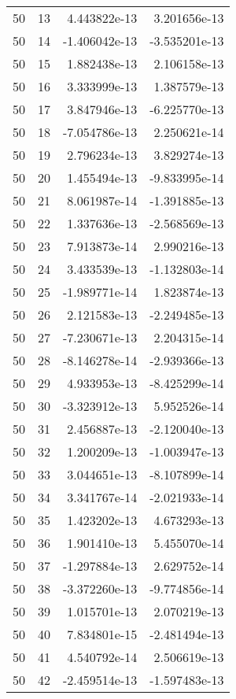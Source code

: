 \begin{tabular}{rrrr}
  50 &   13 &  4.443822e-13 &  3.201656e-13 \\
  50 &   14 & -1.406042e-13 & -3.535201e-13 \\
  50 &   15 &  1.882438e-13 &  2.106158e-13 \\
  50 &   16 &  3.333999e-13 &  1.387579e-13 \\
  50 &   17 &  3.847946e-13 & -6.225770e-13 \\
  50 &   18 & -7.054786e-13 &  2.250621e-14 \\
  50 &   19 &  2.796234e-13 &  3.829274e-13 \\
  50 &   20 &  1.455494e-13 & -9.833995e-14 \\
  50 &   21 &  8.061987e-14 & -1.391885e-13 \\
  50 &   22 &  1.337636e-13 & -2.568569e-13 \\
  50 &   23 &  7.913873e-14 &  2.990216e-13 \\
  50 &   24 &  3.433539e-13 & -1.132803e-14 \\
  50 &   25 & -1.989771e-14 &  1.823874e-13 \\
  50 &   26 &  2.121583e-13 & -2.249485e-13 \\
  50 &   27 & -7.230671e-13 &  2.204315e-14 \\
  50 &   28 & -8.146278e-14 & -2.939366e-13 \\
  50 &   29 &  4.933953e-13 & -8.425299e-14 \\
  50 &   30 & -3.323912e-13 &  5.952526e-14 \\
  50 &   31 &  2.456887e-13 & -2.120040e-13 \\
  50 &   32 &  1.200209e-13 & -1.003947e-13 \\
  50 &   33 &  3.044651e-13 & -8.107899e-14 \\
  50 &   34 &  3.341767e-14 & -2.021933e-14 \\
  50 &   35 &  1.423202e-13 &  4.673293e-13 \\
  50 &   36 &  1.901410e-13 &  5.455070e-14 \\
  50 &   37 & -1.297884e-13 &  2.629752e-14 \\
  50 &   38 & -3.372260e-13 & -9.774856e-14 \\
  50 &   39 &  1.015701e-13 &  2.070219e-13 \\
  50 &   40 &  7.834801e-15 & -2.481494e-13 \\
  50 &   41 &  4.540792e-14 &  2.506619e-13 \\
  50 &   42 & -2.459514e-13 & -1.597483e-13 \\

\end{tabular}
